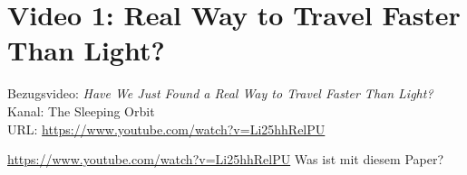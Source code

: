 
\section{Video 1: \glqq Real Way to Travel Faster Than Light?\grqq}

\begin{videobox}
Bezugsvideo: \emph{Have We Just Found a Real Way to Travel Faster Than Light?} \\
Kanal: The Sleeping Orbit \\
URL: \url{https://www.youtube.com/watch?v=Li25hhRelPU}
\end{videobox}

\begin{userbox}
\url{https://www.youtube.com/watch?v=Li25hhRelPU} \quad Was ist mit diesem Paper?
\end{userbox}


